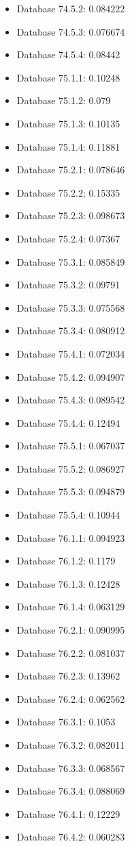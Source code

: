\begin{itemize}
\item Database 74.5.2: 0.084222
\item Database 74.5.3: 0.076674
\item Database 74.5.4: 0.08442
\item Database 75.1.1: 0.10248
\item Database 75.1.2: 0.079
\item Database 75.1.3: 0.10135
\item Database 75.1.4: 0.11881
\item Database 75.2.1: 0.078646
\item Database 75.2.2: 0.15335
\item Database 75.2.3: 0.098673
\item Database 75.2.4: 0.07367
\item Database 75.3.1: 0.085849
\item Database 75.3.2: 0.09791
\item Database 75.3.3: 0.075568
\item Database 75.3.4: 0.080912
\item Database 75.4.1: 0.072034
\item Database 75.4.2: 0.094907
\item Database 75.4.3: 0.089542
\item Database 75.4.4: 0.12494
\item Database 75.5.1: 0.067037
\item Database 75.5.2: 0.086927
\item Database 75.5.3: 0.094879
\item Database 75.5.4: 0.10944
\item Database 76.1.1: 0.094923
\item Database 76.1.2: 0.1179
\item Database 76.1.3: 0.12428
\item Database 76.1.4: 0.063129
\item Database 76.2.1: 0.090995
\item Database 76.2.2: 0.081037
\item Database 76.2.3: 0.13962
\item Database 76.2.4: 0.062562
\item Database 76.3.1: 0.1053
\item Database 76.3.2: 0.082011
\item Database 76.3.3: 0.068567
\item Database 76.3.4: 0.088069
\item Database 76.4.1: 0.12229
\item Database 76.4.2: 0.060283

\end{itemize}
